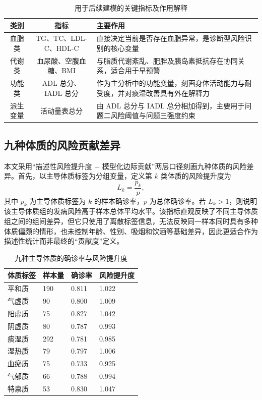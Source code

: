 \documentclass{MathorCupmodeling}
\begin{document}
		\begin{table}[H]
			\centering
				\caption{用于后续建模的关键指标及作用解释}\label{tab:q1_features}
			\begin{tabularx}{0.95\textwidth}{c c X}
			\toprule
			类别 & 指标 & 主要作用\\
			\midrule
			血脂类 & TG、TC、LDL-C、HDL-C & 直接决定当前是否存在血脂异常，是诊断型风险识别的核心变量\\
				代谢类 & 血尿酸、空腹血糖、BMI & 与脂质代谢紊乱、肥胖及胰岛素抵抗存在协同关系，适合用于早预警\\
					功能类 & ADL 总分、IADL 总分 & 作为主分析中的功能变量，刻画身体活动能力与耐受度，并对痰湿改善具有外在解释力\\
					派生变量 & 活动量表总分 & 由 ADL 总分与 IADL 总分相加得到，主要用于问题二风险阈值与问题三强度约束\\
					\bottomrule
				\end{tabularx}
			\end{table}

		\subsection{九种体质的风险贡献差异}
		本文采用“描述性风险提升度 + 模型化边际贡献”两层口径刻画九种体质的风险差异。首先，以主导体质标签为分组变量，定义第 $k$ 类体质的风险提升度为
		\begin{equation}
			L_k=\frac{p_k}{p},
		\end{equation}
		其中 $p_k$ 为主导体质标签为 $k$ 的样本确诊率，$p$ 为总体确诊率。若 $L_k>1$，则说明该主导体质组的发病风险高于样本总体平均水平。该指标直观反映了不同主导体质组之间的组间差异，但它只使用了离散标签信息，无法反映同一样本同时具有多种体质偏颇的情形，也未控制年龄、性别、吸烟和饮酒等基础差异，因此更适合作为描述性统计而非最终的“贡献度”定义。

		\begin{table}[H]
			\centering
			\caption{九种主导体质的确诊率与风险提升度}\label{tab:constitution}
			\begin{tabularx}{0.92\textwidth}{Y Y Y Y}
				\toprule
				体质标签 & 样本量 & 确诊率 & 风险提升度\\
				\midrule
				平和质 & 190 & 0.811 & 1.022 \\
				气虚质 & 90  & 0.800 & 1.009 \\
				阳虚质 & 75  & 0.827 & 1.042 \\
				阴虚质 & 80  & 0.787 & 0.993 \\
				痰湿质 & 292 & 0.781 & 0.985 \\
				湿热质 & 79  & 0.797 & 1.006 \\
				血瘀质 & 75  & 0.733 & 0.925 \\
				气郁质 & 66  & 0.788 & 0.994 \\
				特禀质 & 53  & 0.830 & 1.047 \\
				\bottomrule
			\end{tabularx}
		\end{table}
\end{document}
